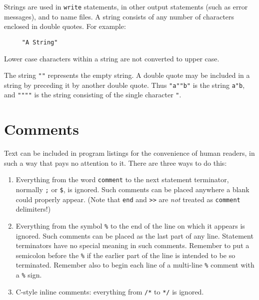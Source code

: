 Strings are used in \texttt{write} statements, in other
output statements (such as error messages), and to name files.  A string
consists of any number of characters enclosed in double quotes.  For example:
\begin{verbatim}
     "A String"
\end{verbatim}
Lower case characters within a string are not converted to upper case.

The string \texttt{""} represents the empty string.  A double quote may be
included in a string by preceding it by another double quote.  Thus
\texttt{"a""b"} is the string \texttt{a"b}, and \texttt{""""} is the string
consisting of the single character \texttt{"}.

\hypertarget{comments}{\section{Comments}}

Text can be included in program listings for the
convenience of human readers, in such a way that {\REDUCE} pays no
attention to it.  There are three ways to do this:

\begin{enumerate}
\item Everything from the word \texttt{comment}
  to the next
statement terminator, normally \texttt{;} or \texttt{\$}, is ignored.  Such comments
can be placed anywhere a blank could properly appear. (Note that \texttt{end}
and \texttt{>}\texttt{>} are \emph{not} treated as \texttt{comment} delimiters!)

\item Everything from the symbol \texttt{\%}
  to the end
of the line on which it appears is ignored.  Such comments can be placed
as the last part of any line.  Statement terminators have no special
meaning in such comments.  Remember to put a semicolon before the \texttt{\%}
if the earlier part of the line is intended to be so terminated.  Remember
also to begin each line of a multi-line \texttt{\%} comment with a \texttt{\%}
sign.

\item C-style inline comments: everything from \texttt{/*} to \texttt{*/}
   is ignored.
\end{enumerate}

